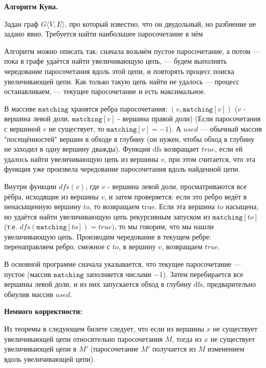     \textbf{Алгоритм Куна.}
    
        Задан граф $G\langle V, E \rangle$, про который известно, что он двудольный, но разбиение не задано явно. Требуется найти наибольшее паросочетание в нём
        
        Алгоритм можно описать так: сначала возьмём пустое паросочетание, а потом — пока в графе удаётся найти увеличивающую цепь, — будем выполнять чередование паросочетания вдоль этой цепи, и повторять процесс поиска увеличивающей цепи. Как только такую цепь найти не удалось — процесс останавливаем, — текущее паросочетание и есть максимальное.
        
        В массиве $\mathtt{matching}$ хранятся ребра паросочетания: $ (v, \mathtt{matching}[v]) $ ($v$ - вершина левой доли, $\mathtt{matching}[v]$ - вершина правой доли) (Если паросочетания с вершиной $ v $ не существует, то $ \mathtt{matching}[v]= -1$). А $used$ — обычный массив "посещённостей" вершин в обходе в глубину (он нужен, чтобы обход в глубину не заходил в одну вершину дважды).
        Функция $ \mathrm{dfs} $ возвращает  $true$, если ей удалось найти увеличивающую цепь из вершины $v$, при этом считается, что эта функция уже произвела чередование паросочетания вдоль найденной цепи.
        
        Внутри функции $dfs(v)$, где $v$ - вершина левой доли, просматриваются все рёбра, исходящие из вершины $v$, и затем проверяется: если это ребро ведёт в ненасыщенную вершину $ to$, то возвращаем true. Если эта вершина $to$ насыщена, но удаётся найти увеличивающую цепь рекурсивным запуском из $\mathtt{matching}[to]$ (т.е. $dfs(\mathtt{matching}[to]) = true)$, то мы говорим, что мы нашли увеличивающую цепь. Производим чередование в текущем ребре: перенаправляем ребро, смежное с $to$, в вершину $v$, возвращаем $true$.
        
        В основной программе сначала указывается, что текущее паросочетание — пустое (массив $ \mathtt{matching}$ заполняется числами $-1$). Затем перебирается все вершины левой доли, и из них запускается обход в глубину $ \mathrm{dfs}$, предварительно обнулив массив $used$. 
        
\textbf{Немного корректности:}

Из теоремы в следующем билете следует, что если из вершины $x$ не существует увеличивающей цепи относительно паросочетания $M$, тогда из $x$ не существует увеличивающей цепи в $M'$ (паросочетание $M'$ получается из $M$ изменением вдоль увеличивающей цепи).

